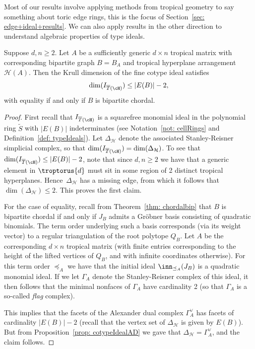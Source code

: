 Most of our results involve applying methods from tropical geometry to say something about toric edge rings, this is the focus of Section~\ref{sec: edge+ideal+results}. We can also apply results in the other direction to understand algebraic properties of type ideals.

\begin{prop}
Suppose $d, n \geq 2$. Let $A$ be a sufficiently generic $d \times n$ tropical matrix with corresponding bipartite graph $B = B_A$ and tropical hyperplane arrangement ${\mathcal H}(A)$. Then the Krull dimension of the fine cotype ideal satisfies
\
\[\dim(I_{\overline{T}(\cH)}) \leq |E(B)| - 2,\]
with equality if and only if $B$ is bipartite chordal.
\end{prop}

\begin{proof}
First recall that $I_{\overline{T}(\cH)}$ is a squarefree monomial ideal in the polynomial ring $\widetilde{S}$ with $|E(B)|$ indeterminates (see Notation~\ref{not: cellRings} and Definition~\ref{def: typeIdeals}).  Let $\Delta_{\mathcal H}$ denote the associated Stanley-Reisner simplicial complex, so that $\dim(I_{\overline{T}(\cH)}) = \dim (\Delta_{\mathcal H})$. 
To see that $\dim(I_{\overline{T}(\cH)}) \leq |E(B)| - 2$, note that since $d, n \geq 2$ we have that a generic element in $\troptorus{d}$ must sit in some region of 2 distinct tropical hyperplanes.  Hence~$\Delta_{\mathcal H}$ has a missing edge, from which it follows that $\dim(\Delta_{\mathcal H}) \leq 2$.  This proves the first claim.

For the case of equality, recall from Theorem~\ref{thm: chordalbip} that $B$ is bipartite chordal if and only if $J_B$ admits a Gr\"obner basis consisting of quadratic binomials. The term order underlying such a basis corresponds (via its weight vector) to a regular triangulation of the root polytope $Q_B$. Let $A$ be the corresponding $d \times n$ tropical matrix (with finite entries corresponding to the height of the lifted vertices of $Q_B$, and with infinite coordinates otherwise).  For this term order $\preceq_A$ we have that the initial ideal $\inn_{\preceq_A}(J_B)$ is a quadratic monomial ideal.  If we let $\Gamma_A$ denote the Stanley-Reisner complex of this ideal, it then follows that the minimal nonfaces of $\Gamma_A$ have cardinality 2 (so that $\Gamma_A$ is a so-called \emph{flag} complex). 

This implies that the facets of the Alexander dual complex $\Gamma_A^\vee$ has facets of cardinality $|E(B)| - 2$ (recall that the vertex set of $\Delta_{\mathcal H}$ is given by $E(B)$).  But from Proposition~\ref{prop: cotypeIdealAD} we gave that $\Delta_{\mathcal H} = \Gamma_A^\vee$, and the claim follows.
\end{proof}

